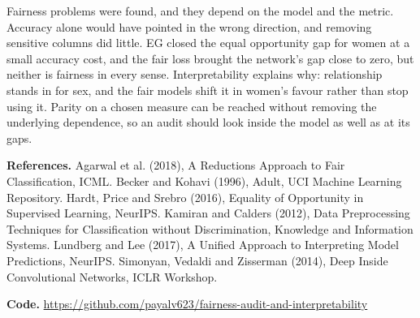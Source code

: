 \documentclass[10pt,a4paper]{article}
\begin{document}
Fairness problems were found, and they depend on the model and the metric. Accuracy alone would have pointed in the wrong direction, and removing sensitive columns did little. EG closed the equal opportunity gap for women at a small accuracy cost, and the fair loss brought the network's gap close to zero, but neither is fairness in every sense. Interpretability explains why: relationship stands in for sex, and the fair models shift it in women's favour rather than stop using it. Parity on a chosen measure can be reached without removing the underlying dependence, so an audit should look inside the model as well as at its gaps.

{\small \textbf{References.} Agarwal et al. (2018), A Reductions Approach to Fair Classification, ICML. Becker and Kohavi (1996), Adult, UCI Machine Learning Repository. Hardt, Price and Srebro (2016), Equality of Opportunity in Supervised Learning, NeurIPS. Kamiran and Calders (2012), Data Preprocessing Techniques for Classification without Discrimination, Knowledge and Information Systems. Lundberg and Lee (2017), A Unified Approach to Interpreting Model Predictions, NeurIPS. Simonyan, Vedaldi and Zisserman (2014), Deep Inside Convolutional Networks, ICLR Workshop.}

{\small \textbf{Code.} \url{https://github.com/payalv623/fairness-audit-and-interpretability}}
\end{document}
